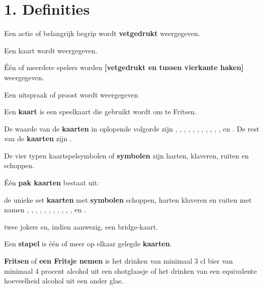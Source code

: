 \newpage
\drawBar{}

\vspace{-0.5cm}
\section*{1. Definities}

\item Een actie of belangrijk begrip wordt \textbf{vetgedrukt} weergegeven.

\item Een kaart wordt  weergegeven.

\item Één of meerdere spelers worden \textbf{[vetgedrukt en tussen vierkante haken]} weergegeven.

\item Een uitspraak of proost wordt  weergegeven 

\item Een \textbf{kaart} is een speelkaart die gebruikt wordt om te Fritsen.

\item \label{item:kaarten_2} De waarde van de \textbf{kaarten} in oplopende volgorde zijn , , , , , , , , , , ,  en . De rest van de \textbf{kaarten} zijn .

\item De vier typen kaartspelsymbolen of \textbf{symbolen} zijn harten, klaveren, ruiten en schoppen. 

\item \label{item:kaarten} \'E\'en \textbf{pak kaarten} bestaat uit: 
    \puntLijst{}
        \item de unieke set \textbf{kaarten} met \textbf{symbolen} schoppen, harten klaveren en ruiten met namen , , , , , , , , , , ,  en .
        \item twee jokers en, indien aanwezig, een bridge-kaart.
    \eindPuntLijst{}

\item Een \textbf{stapel} is één of meer op elkaar gelegde \textbf{kaarten}.

\item \label{def:fritsen} \textbf{Fritsen} of \textbf{een Fritsje nemen} is het drinken van minimaal 3 cl bier van minimaal 4 procent alcohol uit een shotglaasje of het drinken van een equivalente hoeveelheid alcohol uit een ander glas.

